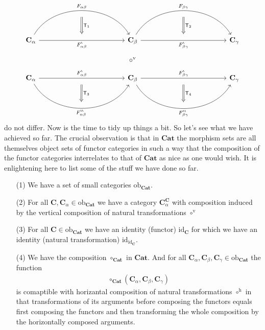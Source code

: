 \[
\begin{tikzcd}[row sep=huge, column sep=6em]
  \mathbf{C}_{\alpha}
  \arrow[bend left=60]{rr}[name=fab]{F_{\alpha\beta}}
  \arrow[swap]{rr}[name=fab*1]{F_{\alpha\beta}^{\backprime}}
  &
  &
  \mathbf{C}_{\beta}
  \arrow[bend left=60]{rr}[name=fbc]{F_{\beta\gamma}}
  \arrow[swap]{rr}[name=fbc*1]{F_{\beta\gamma}^{\backprime}}
  \arrow[phantom]{d}{\circ^{\textrm{v}}}
  &
  &
  \mathbf{C}_{\gamma}
  \\
  \mathbf{C}_{\alpha}
  \arrow{rr}[name=fab*2]{F_{\alpha\beta}^{\backprime}}
  \arrow[bend right=60,swap]{rr}[name=fab**]{F_{\alpha\beta}^{\backprime\backprime}}
  &
  &
  \mathbf{C}_{\beta}
  \arrow{rr}[name=fbc*2]{F_{\beta\gamma}^{\backprime}}
  \arrow[bend right=60,swap]{rr}[name=fbc**]{F_{\beta\gamma}^{\backprime\backprime}}
  &
  &
  \mathbf{C}_{\gamma}
  \arrow[from=fab,to=fab*1,shorten <= 9pt,shorten >= 9pt,Rightarrow]{d}{\mathsf{T}_{1}}
  \arrow[from=fab*2,to=fab**,shorten <= 9pt,shorten >= 9pt,Rightarrow]{d}{\mathsf{T}_{3}}
  \arrow[from=fbc,to=fbc*1,shorten <= 9pt,shorten >= 9pt,Rightarrow]{d}{\mathsf{T}_{2}}
  \arrow[from=fbc*2,to=fbc**,shorten <= 9pt,shorten >= 9pt,Rightarrow]{d}{\mathsf{T}_{4}}
\end{tikzcd}
\]
do not differ. Now is the time to tidy up things a bit. So let's see what we have achieved so far. The crucial observation is that in $\mathbf{Cat}$ the morphism sets are all themselves object sets of functor categories in such a way that the composition of the functor categories interrelates to that of $\mathbf{Cat}$ as nice as one would wish. It is enlightening here to list some of the stuff we have done so far.
\begin{enumerate}
\item[(1)]
We have a set of small categories $\mathrm{ob}_{\mathbf{Cat}}$.
\item[(2)]
For all $\mathbf{C},\mathbf{C}_{\alpha} \in \mathrm{ob}_{\mathbf{Cat}}$ we have a category $\mathbf{C}_{\alpha}^{\mathbf{C}}$ with composition induced by the vertical composition of natural transformations $\circ^{\textrm{v}}$
\item[(3)]
For all $\mathbf{C} \in \mathrm{ob}_{\mathbf{Cat}}$ we have an identity (functor) $\mathrm{id}_{\mathbf{C}}$ for which we have an identity (natural transformation) $\mathrm{id}_{\mathrm{id}_{\mathbf{C}}}$.
\item[(4)]
We have the composition $\circ_{\mathbf{Cat}}$ in $\mathbf{Cat}$. And for all $\mathbf{C}_{\alpha},\mathbf{C}_{\beta},\mathbf{C}_{\gamma} \in \mathrm{ob}_{\mathbf{Cat}}$ the function
\begin{align*}
  \circ_{\mathbf{Cat}}
  (\mathbf{C}_{\alpha},\mathbf{C}_{\beta},\mathbf{C}_{\gamma})
\end{align*}
is comaptible with horizantal composition of natural transformations $\circ^{\textrm{h}}$ in that transformations of its arguments before composing the functors equals first composing the functors and then transforming the whole composition by the horizontally composed arguments.
\end{enumerate}
